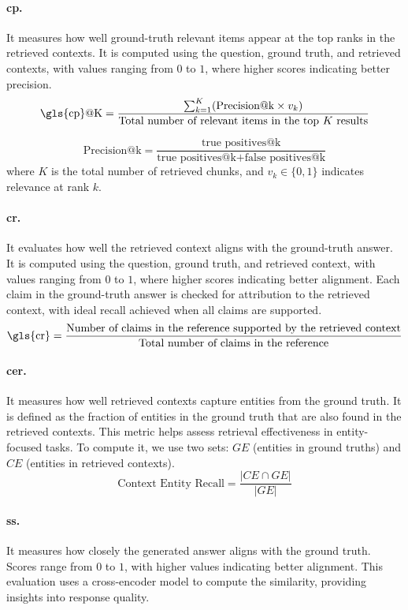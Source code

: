 \paragraph*{\gls{cp}.} It measures how well ground-truth relevant items appear at the top ranks in the retrieved contexts. It is computed using the question, ground truth, and retrieved contexts, with values ranging from $0$ to $1$, where higher scores indicating better precision.
\[
\text{\gls{cp}@K} =
\frac{\sum_{k=1}^{K} (\text{Precision@k} \times v_k)}
{\text{Total number of relevant items in the top } K \text{ results}}
\]

\[
\text{Precision@k} = 
\frac{\text{true positives@k}}{\text{true positives@k} + \text{false positives@k}}
\]
where $K$ is the total number of retrieved chunks, and  $v_k \in \{0,1\}$  indicates relevance at rank $k$.

\paragraph*{\gls{cr}.} It evaluates how well the retrieved context aligns with the ground-truth answer.
It is computed using the question, ground truth, and retrieved context, with values ranging from $0$ to $1$, where higher scores indicating better alignment.
Each claim in the ground-truth answer is checked for attribution to the retrieved context, with ideal recall achieved when all claims are supported.
\[
\text{\gls{cr}} =
\frac{\text{Number of claims in the reference supported by the retrieved context}}
{\text{Total number of claims in the reference}}
\]

\paragraph*{\gls{cer}.} It measures how well retrieved contexts capture entities from the ground truth.
It is defined as the fraction of entities in the ground truth that are also found in the retrieved contexts.
This metric helps assess retrieval effectiveness in entity-focused tasks.
To compute it, we use two sets: $GE$ (entities in ground truths) and $CE$ (entities in retrieved contexts).
\[
\text{Context Entity Recall} = \frac{|CE \cap GE|}{|GE|}
\]

\paragraph*{\gls{ss}.} It measures how closely the generated answer aligns with the ground truth.
Scores range from $0$ to $1$, with higher values indicating better alignment.
This evaluation uses a cross-encoder model to compute the similarity, providing insights into response quality.

